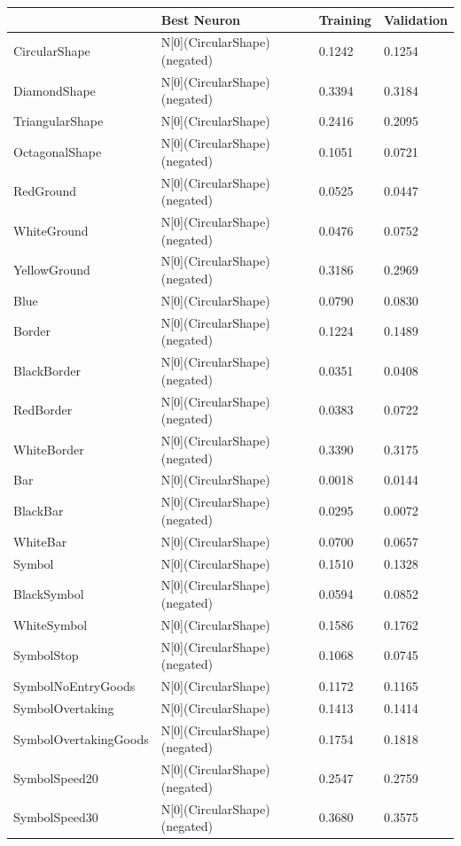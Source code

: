 \begin{tabular}{llll}
\toprule
 & Best Neuron & Training & Validation \\
\midrule
CircularShape & N[0](CircularShape) (negated) & 0.1242 & 0.1254 \\
DiamondShape & N[0](CircularShape) (negated) & 0.3394 & 0.3184 \\
TriangularShape & N[0](CircularShape) & 0.2416 & 0.2095 \\
OctagonalShape & N[0](CircularShape) (negated) & 0.1051 & 0.0721 \\
RedGround & N[0](CircularShape) (negated) & 0.0525 & 0.0447 \\
WhiteGround & N[0](CircularShape) (negated) & 0.0476 & 0.0752 \\
YellowGround & N[0](CircularShape) (negated) & 0.3186 & 0.2969 \\
Blue & N[0](CircularShape) & 0.0790 & 0.0830 \\
Border & N[0](CircularShape) (negated) & 0.1224 & 0.1489 \\
BlackBorder & N[0](CircularShape) (negated) & 0.0351 & 0.0408 \\
RedBorder & N[0](CircularShape) (negated) & 0.0383 & 0.0722 \\
WhiteBorder & N[0](CircularShape) (negated) & 0.3390 & 0.3175 \\
Bar & N[0](CircularShape) & 0.0018 & 0.0144 \\
BlackBar & N[0](CircularShape) (negated) & 0.0295 & 0.0072 \\
WhiteBar & N[0](CircularShape) & 0.0700 & 0.0657 \\
Symbol & N[0](CircularShape) & 0.1510 & 0.1328 \\
BlackSymbol & N[0](CircularShape) (negated) & 0.0594 & 0.0852 \\
WhiteSymbol & N[0](CircularShape) & 0.1586 & 0.1762 \\
SymbolStop & N[0](CircularShape) (negated) & 0.1068 & 0.0745 \\
SymbolNoEntryGoods & N[0](CircularShape) & 0.1172 & 0.1165 \\
SymbolOvertaking & N[0](CircularShape) & 0.1413 & 0.1414 \\
SymbolOvertakingGoods & N[0](CircularShape) (negated) & 0.1754 & 0.1818 \\
SymbolSpeed20 & N[0](CircularShape) (negated) & 0.2547 & 0.2759 \\
SymbolSpeed30 & N[0](CircularShape) (negated) & 0.3680 & 0.3575 \\

\end{tabular}

